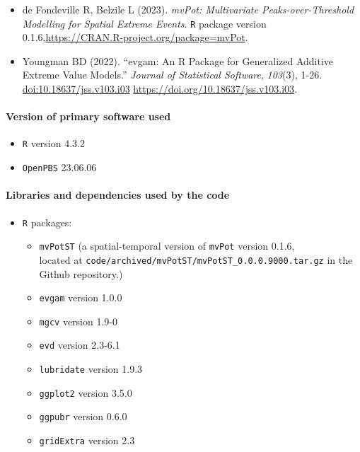 \documentclass[
]{article}
\providecommand{\tightlist}{%
  \setlength{\itemsep}{0pt}\setlength{\parskip}{0pt}}
\begin{document}
\begin{itemize}
\tightlist
\item
  de Fondeville R, Belzile L (2023). \emph{mvPot: Multivariate
  Peaks-over-Threshold Modelling for Spatial Extreme Events}. \texttt{R}
  package version 0.1.6,\url{https://CRAN.R-project.org/package=mvPot}.
\item
  Youngman BD (2022). ``evgam: An R Package for Generalized Additive
  Extreme Value Models.'' \emph{Journal of Statistical Software},
  \emph{103}(3), 1-26. \url{doi:10.18637/jss.v103.i03}
  \url{https://doi.org/10.18637/jss.v103.i03}.
\end{itemize}

\paragraph{Version of primary software
used}\label{version-of-primary-software-used}

\begin{itemize}
\tightlist
\item
  \texttt{R} version 4.3.2
\item
  \texttt{OpenPBS} 23.06.06
\end{itemize}

\paragraph{Libraries and dependencies used by the
code}\label{libraries-and-dependencies-used-by-the-code}

\begin{itemize}
\tightlist
\item
  \texttt{R} packages:

  \begin{itemize}
  \tightlist
  \item
    \texttt{mvPotST} (a spatial-temporal version of \texttt{mvPot}
    version 0.1.6,\\
    located at \texttt{code/archived/mvPotST/mvPotST\_0.0.0.9000.tar.gz}
    in the Github repository.)
  \item
    \texttt{evgam} version 1.0.0
  \item
    \texttt{mgcv} version 1.9-0
  \item
    \texttt{evd} version 2.3-6.1\\
  \item
    \texttt{lubridate} version 1.9.3
  \item
    \texttt{ggplot2} version 3.5.0
  \item
    \texttt{ggpubr} version 0.6.0
  \item
    \texttt{gridExtra} version 2.3
  \end{itemize}
\end{itemize}
\end{document}
